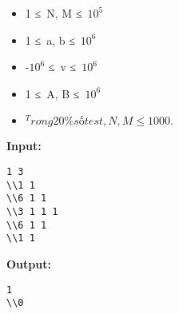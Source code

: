 \begin{itemize}
	\item     1 ≤ N, M ≤ $10^{5}$
	\item     1 ≤ a, b ≤ $10^{6}$
	\item     -$10^{6}$    ≤ v ≤ $10^{6}$
	\item     1 ≤ A, B ≤ $10^{6}$
	\item $^     Trong 20\% số test, N, M ≤ 1000.    $
\end{itemize}
\textbf{    Input:   }
\begin{verbatim}
1 3
\\1 1
\\6 1 1 
\\3 1 1 1 
\\6 1 1
\\1 1\end{verbatim}

\textbf{    Output:   }
\begin{verbatim}
1
\\0\end{verbatim}